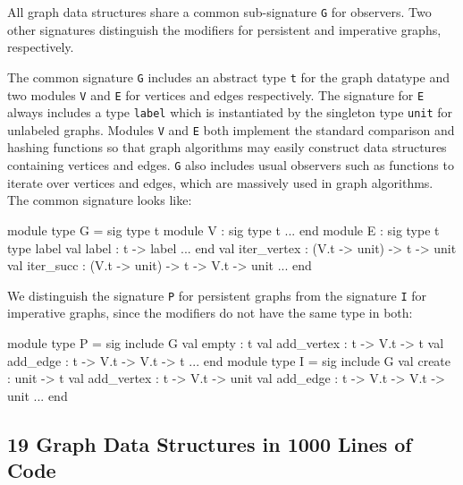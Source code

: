 \documentclass[tfpsymp,pagenumbers]{tfp07symp}
\begin{document}
All graph data structures share a common sub-signature \texttt{G} for
observers. Two other signatures distinguish the modifiers for
persistent and imperative graphs, respectively.

The common signature \texttt{G} includes an abstract type \texttt{t}
for the graph datatype and two modules \texttt{V} and \texttt{E} for
vertices and edges respectively. The signature for \texttt{E} always
includes a type \texttt{label} which is instantiated by the singleton
type \texttt{unit} for unlabeled graphs. Modules \texttt{V} and
\texttt{E} both implement the standard comparison and hashing
functions so that graph algorithms may easily construct data
structures containing vertices and edges.  \texttt{G} also includes
usual observers such as functions to iterate over vertices and edges,
which are massively used in graph algorithms.  The common signature
looks like:


\begin{ocaml}
module type G = sig
  type t
  module V : sig type t ... end
  module E : sig
    type t 
    type label 
    val label : t -> label
    ...
  end
  val iter_vertex : (V.t -> unit) -> t -> unit
  val iter_succ : (V.t -> unit) -> t -> V.t -> unit
  ...
end
\end{ocaml}
We distinguish the signature \texttt{P} for persistent graphs
from the signature \texttt{I} for imperative graphs, since the modifiers do
not have the same type in both:
\begin{ocaml}
module type P = sig
  include G
  val empty : t
  val add_vertex : t -> V.t -> t
  val add_edge : t -> V.t -> V.t -> t
  ...
end
module type I = sig
  include G
  val create : unit -> t
  val add_vertex : t -> V.t -> unit
  val add_edge : t -> V.t -> V.t -> unit
  ...
end
\end{ocaml}

\subsection{19 Graph Data Structures in 1000 Lines of Code}\label{structuresdedonnees}
\end{document}
